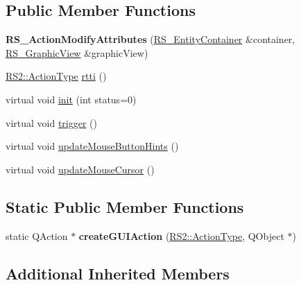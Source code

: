 \subsection*{Public Member Functions}
\begin{DoxyCompactItemize}
\item 
\hypertarget{classRS__ActionModifyAttributes_ae01e3706ea77296c3a19bce56514e522}{{\bfseries R\-S\-\_\-\-Action\-Modify\-Attributes} (\hyperlink{classRS__EntityContainer}{R\-S\-\_\-\-Entity\-Container} \&container, \hyperlink{classRS__GraphicView}{R\-S\-\_\-\-Graphic\-View} \&graphic\-View)}\label{classRS__ActionModifyAttributes_ae01e3706ea77296c3a19bce56514e522}

\item 
\hyperlink{classRS2_afe3523e0bc41fd637b892321cfc4b9d7}{R\-S2\-::\-Action\-Type} \hyperlink{classRS__ActionModifyAttributes_a4617be4ad775927001036ac659ca6d6a}{rtti} ()
\item 
virtual void \hyperlink{classRS__ActionModifyAttributes_af9dfbcc44a5abf745e97cb56413363cd}{init} (int status=0)
\item 
virtual void \hyperlink{classRS__ActionModifyAttributes_a88c6aaf17fda9941a59b4de0b68d38b1}{trigger} ()
\item 
virtual void \hyperlink{classRS__ActionModifyAttributes_abff195984a8ef529a788d3621d75c90b}{update\-Mouse\-Button\-Hints} ()
\item 
virtual void \hyperlink{classRS__ActionModifyAttributes_afc2e0ce5b03f81c5b8400303c6540419}{update\-Mouse\-Cursor} ()
\end{DoxyCompactItemize}
\subsection*{Static Public Member Functions}
\begin{DoxyCompactItemize}
\item 
\hypertarget{classRS__ActionModifyAttributes_a5fee67401e61687174c9e311048c0af3}{static Q\-Action $\ast$ {\bfseries create\-G\-U\-I\-Action} (\hyperlink{classRS2_afe3523e0bc41fd637b892321cfc4b9d7}{R\-S2\-::\-Action\-Type}, Q\-Object $\ast$)}\label{classRS__ActionModifyAttributes_a5fee67401e61687174c9e311048c0af3}

\end{DoxyCompactItemize}
\subsection*{Additional Inherited Members}


